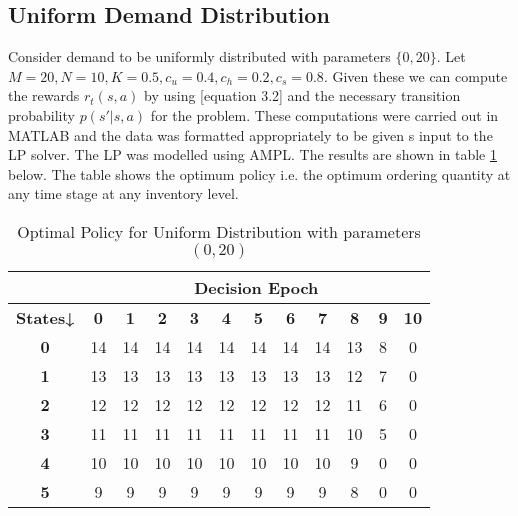 \documentclass[11pt,a4paper,oneside]{report}
\begin{document}
\subsection{Uniform Demand Distribution}
Consider demand to be uniformly distributed with parameters ${\lbrace0,20\rbrace}$. Let $M = 20, N = 10, K = 0.5, c_u = 0.4, c_h=0.2, c_s=0.8$. Given these we can compute the rewards $r_t(s,a)$ by using [equation 3.2] and the necessary transition probability $p(s'|s,a)$ for the problem. These computations were carried out in MATLAB and the data was formatted appropriately to be given s input to the LP solver. The LP was modelled using AMPL. The results are shown in table \ref{t1} below. The table shows the optimum policy i.e. the optimum ordering quantity at any time stage at any inventory level.
\begin{table}[H]
\centering
\caption{Optimal Policy for Uniform Distribution with parameters $(0,20)$}
\label{t1}
\begin{tabular}{|c|c|c|c|c|c|c|c|c|c|c|c|}
\hline
\textbf{}        & \multicolumn{11}{c|}{\textbf{Decision Epoch}}                                                                                                 \\ \hline
\textbf{States↓} & \textbf{0} & \textbf{1} & \textbf{2} & \textbf{3} & \textbf{4} & \textbf{5} & \textbf{6} & \textbf{7} & \textbf{8} & \textbf{9} & \textbf{10} \\ \hline
\textbf{0}       & 14         & 14         & 14         & 14         & 14         & 14         & 14         & 14         & 13         & 8          & 0           \\ \hline
\textbf{1}       & 13         & 13         & 13         & 13         & 13         & 13         & 13         & 13         & 12         & 7          & 0           \\ \hline
\textbf{2}       & 12         & 12         & 12         & 12         & 12         & 12         & 12         & 12         & 11         & 6          & 0           \\ \hline
\textbf{3}       & 11         & 11         & 11         & 11         & 11         & 11         & 11         & 11         & 10         & 5          & 0           \\ \hline
\textbf{4}       & 10         & 10         & 10         & 10         & 10         & 10         & 10         & 10         & 9          & 0          & 0           \\ \hline
\textbf{5}       & 9          & 9          & 9          & 9          & 9          & 9          & 9          & 9          & 8          & 0          & 0           \\ \hline

\end{tabular}
\end{table}
\end{document}
